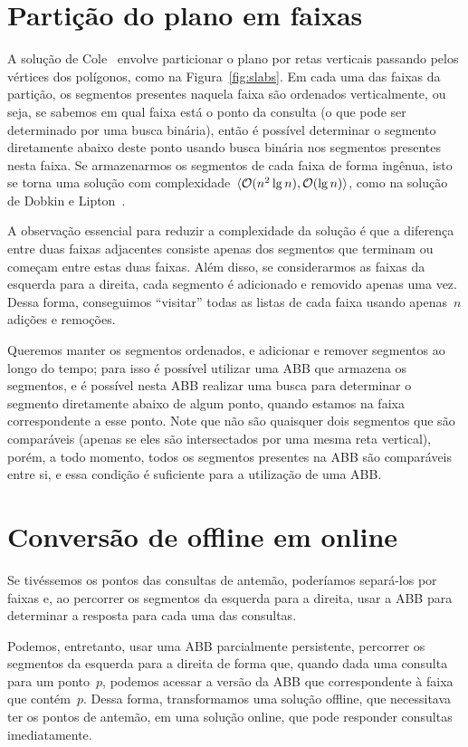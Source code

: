 \documentclass[main.tex]{subfiles}
\begin{document}
\section{Partição do plano em faixas}

A solução de Cole~\cite{Cole86} envolve particionar o plano por retas verticais passando pelos vértices dos polígonos, como na Figura~\ref{fig:slabs}. Em cada uma das faixas da partição, os segmentos presentes naquela faixa são ordenados verticalmente, ou seja, se sabemos em qual faixa está o ponto da consulta (o que pode ser determinado por uma busca binária), então é possível determinar o segmento diretamente abaixo deste ponto usando busca binária nos segmentos presentes nesta faixa.
Se armazenarmos os segmentos de cada faixa de forma ingênua, isto se torna uma solução com complexidade~$\langle\mathcal{O}(n^2 \lg n), \mathcal{O}(\lg n)\rangle$, como na solução de Dobkin e Lipton~\cite{DobkinL76}.

A observação essencial para reduzir a complexidade da solução é que a diferença entre duas faixas adjacentes consiste apenas dos segmentos que terminam ou começam entre estas duas faixas. Além disso, se considerarmos as faixas da esquerda para a direita, cada segmento é adicionado e removido apenas uma vez. Dessa forma, conseguimos ``visitar'' todas as listas de cada faixa usando apenas~$n$ adições e remoções.

Queremos manter os segmentos ordenados, e adicionar e remover segmentos ao longo do tempo; para isso é possível utilizar uma ABB que armazena os segmentos, e é possível nesta ABB realizar uma busca para determinar o segmento diretamente abaixo de algum ponto, quando estamos na faixa correspondente a esse ponto. Note que não são quaisquer dois segmentos que são comparáveis (apenas se eles são intersectados por uma mesma reta vertical), porém, a todo momento, todos os segmentos presentes na ABB são comparáveis entre si, e essa condição é suficiente para a utilização de uma ABB.

\section{Conversão de offline em online}

Se tivéssemos os pontos das consultas de antemão, poderíamos separá-los por faixas e, ao percorrer os segmentos da esquerda para a direita, usar a ABB para determinar a resposta para cada uma das consultas.

Podemos, entretanto, usar uma ABB parcialmente persistente, percorrer os segmentos da esquerda para a direita de forma que, quando dada uma consulta para um ponto~$p$, podemos acessar a versão da ABB que correspondente à faixa que contém~$p$. Dessa forma, transformamos uma solução offline, que necessitava ter os pontos de antemão, em uma solução online, que pode responder consultas imediatamente.
\end{document}
